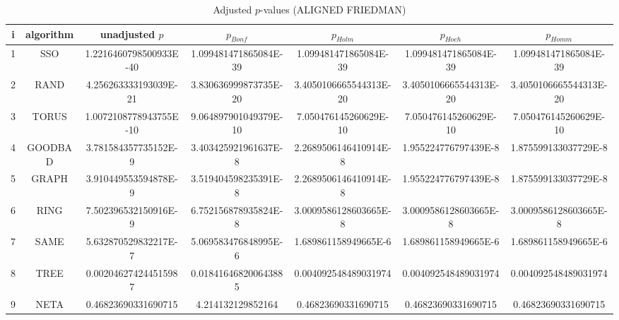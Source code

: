 \documentclass[a4paper,10pt]{article}
\begin{document}
\begin{landscape}
\begin{table}[!htp]
\centering\scriptsize
\caption{Adjusted $p$-values (ALIGNED FRIEDMAN)}
\begin{tabular}{ccccccc}
i&algorithm&unadjusted $p$&$p_{Bonf}$&$p_{Holm}$&$p_{Hoch}$&$p_{Homm}$\\
\hline
1& SSO&1.2216460798500933E-40&1.099481471865084E-39&1.099481471865084E-39&1.099481471865084E-39&1.099481471865084E-39\\
2& RAND&4.256263333193039E-21&3.830636999873735E-20&3.4050106665544313E-20&3.4050106665544313E-20&3.4050106665544313E-20\\
3& TORUS&1.0072108778943755E-10&9.064897901049379E-10&7.050476145260629E-10&7.050476145260629E-10&7.050476145260629E-10\\
4& GOODBAD&3.781584357735152E-9&3.403425921961637E-8&2.2689506146410914E-8&1.955224776797439E-8&1.875599133037729E-8\\
5& GRAPH&3.910449553594878E-9&3.519404598235391E-8&2.2689506146410914E-8&1.955224776797439E-8&1.875599133037729E-8\\
6& RING&7.502396532150916E-9&6.752156878935824E-8&3.0009586128603665E-8&3.0009586128603665E-8&3.0009586128603665E-8\\
7& SAME&5.632870529832217E-7&5.069583476848995E-6&1.689861158949665E-6&1.689861158949665E-6&1.689861158949665E-6\\
8& TREE&0.002046274244515987&0.018416468200643885&0.004092548489031974&0.004092548489031974&0.004092548489031974\\
9& NETA&0.46823690331690715&4.214132129852164&0.46823690331690715&0.46823690331690715&0.46823690331690715\\
\hline
\end{tabular}
\end{table}


\end{landscape}
\end{document}
